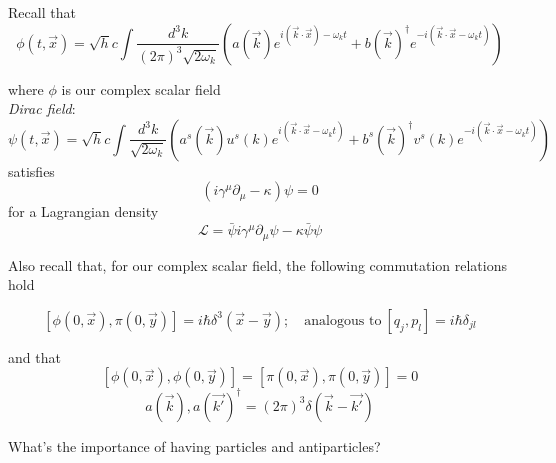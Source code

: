 \documentclass[11pt]{article}
\author{}
\title{}
\date{}
\newcommand{\lag}{\mathcal{L}}
\begin{document}
	
	\pagestyle{fancy}
	\maketitle
	
	\vspace{-8em}
	
	
	\noindent
	
	\vspace{11pt}

	Recall that \[ \phi(t, \vec{x}) = \sqrt{h}c \int \frac{d^3 k}{(2\pi)^3\sqrt{2\omega_k}} (a(\vec{k}) e^{i(\vec{k}\cdot \vec{x}) - \omega_k t}  + b(\vec{k})^\dagger e^{-i(\vec{k}\cdot \vec{x} - \omega_k t)} )  \]
	
	
	where $\phi$ is our complex scalar field\\
	
	\textit{Dirac field}: \[ \psi(t, \vec{x}) = \sqrt{h}c \int \frac{d^3 k}{\sqrt{2\omega_k}} ( a^s(\vec{k}) u^s(k) e^{i(\vec{k}\cdot\vec{x}-\omega_k t)} +b^s(\vec{k})^\dagger v^s(k)e^{-i(\vec{k}\cdot\vec{x} - \omega_kt)} )  \] satisfies \[(i\gamma^\mu \partial_\mu - \kappa)\psi = 0\]
	for a Lagrangian density \[\lag = \bar{\psi}i\gamma^\mu\partial_\mu\psi - \kappa\bar{\psi}\psi\]
	
	Also recall that, for our complex scalar field, the following commutation relations hold
	
	\[ [\phi(0, \vec{x}), \pi(0, \vec{y})] = i\hbar \delta^3(\vec{x}-\vec{y});\quad \text{analogous to}\ [q_j, p_l] = i\hbar \delta_{jl}\]
	
	and that \[ [\phi(0, \vec{x}) , \phi(0, \vec{y})] = [\pi(0, \vec{x}), \pi(0, \vec{y})] = 0 \]
	\[ a(\vec{k}), a(\vec{k'})^\dagger = (2\pi)^3 \delta(\vec{k} - \vec{k'})\]


	What's the importance of having particles and antiparticles?\\
	
\end{document}
